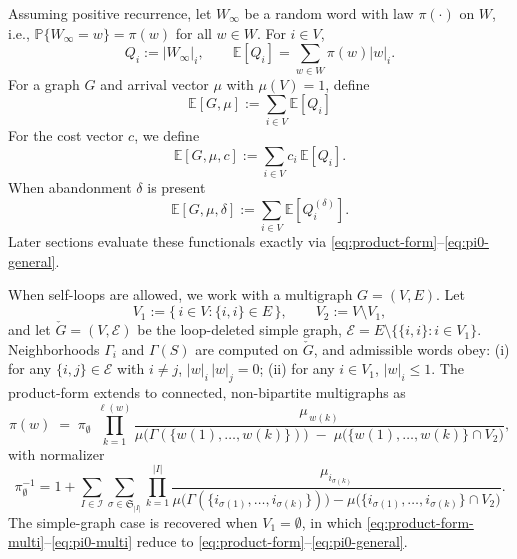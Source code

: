 \documentclass[11pt]{article}
\begin{document}
{Assuming positive recurrence, let $W_\infty$ be a random word with law $\pi(\cdot)$ on $W$, i.e., $\mathbb{P}\{W_\infty=w\}=\pi(w)$ for all $w\in W$.
For $i\in V$,
\begin{equation}\label{eq:defqi}
Q_i:=|W_\infty|_i,\qquad 
\mathbb{E}[Q_i]=\sum_{w\in W}\pi(w)|w|_i.   
\end{equation}
For a graph $G$ and arrival vector $\mu$ with $\mu(V)=1$, define
\begin{equation}\label{eq:expqi}
\mathbb{E}[G,\mu]:=\sum_{i\in V}\mathbb{E}[Q_i]
\end{equation}
For the cost vector $c$, we define 
\begin{equation}\label{eq:expcqi}
\mathbb{E}[G,\mu,c]:=\sum_{i\in V}c_i\,\mathbb{E}[Q_i].   
\end{equation}
When abandonment $\delta$ is present
\begin{equation}\label{eq:expdqi}
\mathbb{E}[G,\mu,\delta]:=\sum_{i\in V}\mathbb{E}\left[Q_i^{(\delta)}\right].    
\end{equation}
Later sections evaluate these functionals exactly via \eqref{eq:product-form}–\eqref{eq:pi0-general}.

When self-loops are allowed, we work with a multigraph $G=(V,E)$.
Let 
\[
V_1:=\{\,i\in V:\{i,i\}\in E\,\},\qquad V_2:=V\setminus V_1,
\]
and let $\check{G}=(V,\mathcal{E})$ be the loop-deleted simple graph, $\mathcal{E}=E\setminus\{\{i,i\}:i\in V_1\}$.
Neighborhoods $\Gamma_i$ and $\Gamma(S)$ are computed on $\check{G}$, and admissible words obey:
(i) for any $\{i,j\}\in \mathcal{E}$ with $i\ne j$, $|w|_i\,|w|_j=0$;
(ii) for any $i\in V_1$, $|w|_i\le 1$.
The product-form extends to connected, non-bipartite multigraphs as
\begin{equation}\label{eq:product-form-multi}
\pi(w)\;=\;\pi_{\emptyset}\;\prod_{k=1}^{\ell(w)}
\frac{\mu_{\,w(k)}}{\mu\!\bigl(\Gamma(\{w(1),\ldots,w(k)\})\bigr)\;-\;\mu\!\bigl(\{w(1),\ldots,w(k)\}\cap V_2\bigr)},
\end{equation}
with normalizer
\begin{equation}\label{eq:pi0-multi}
\pi_{\emptyset}^{-1}=1+\sum_{I\in\mathcal{I}}\sum_{\sigma\in \mathfrak{S}_{|I|}}\prod_{k=1}^{|I|}
\frac{\mu_{i_{\sigma(k)}}}{\mu\bigl(\Gamma(\{i_{\sigma(1)},\ldots,i_{\sigma(k)}\})\bigr)-\mu\bigl(\{i_{\sigma(1)},\ldots,i_{\sigma(k)}\}\cap V_2\bigr)}.
\end{equation}
The simple-graph case is recovered when $V_1=\emptyset$, in which \eqref{eq:product-form-multi}–\eqref{eq:pi0-multi} reduce to \eqref{eq:product-form}–\eqref{eq:pi0-general}.

}
\end{document}
